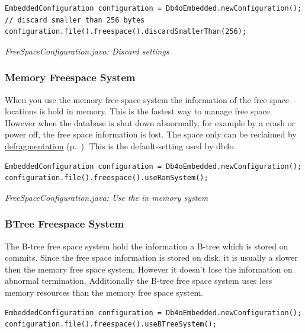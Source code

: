 \begin{lstlisting}
EmbeddedConfiguration configuration = Db4oEmbedded.newConfiguration();
// discard smaller than 256 bytes
configuration.file().freespace().discardSmallerThan(256);
\end{lstlisting}

{\small\itshape FreeSpaceConfiguration.java: Discard settings\par}
\medskip

\subsubsection{Memory Freespace System}
\label{ref:configuration-file-freespace-configuration:memorysystem}

When you use the memory free-space system the information of the free space locations is hold in memory. This is the fastest way to manage free space. However when the database is shut down abnormally, for example by a crash or power off, the free space information is lost. The space only can be reclaimed by \hyperref[ref:advanced-topics-defragment]{defragmentation} (p.~\pageref{ref:advanced-topics-defragment}). This is the default-setting used by db4o.

\begin{lstlisting}
EmbeddedConfiguration configuration = Db4oEmbedded.newConfiguration();
configuration.file().freespace().useRamSystem();
\end{lstlisting}

{\small\itshape FreeSpaceConfiguration.java: Use the in memory system\par}
\medskip

\subsubsection{BTree Freespace System}
\label{ref:configuration-file-freespace-configuration:btreesystem}

The B-tree free space system hold the information a B-tree which is stored on commits. Since the free space information is stored on disk, it is usually a slower then the memory free space system. However it doesn't lose the information on abnormal termination. Additionally the B-tree free space system uses less memory resources than the memory free space system.

\begin{lstlisting}
EmbeddedConfiguration configuration = Db4oEmbedded.newConfiguration();
configuration.file().freespace().useBTreeSystem();
\end{lstlisting}

